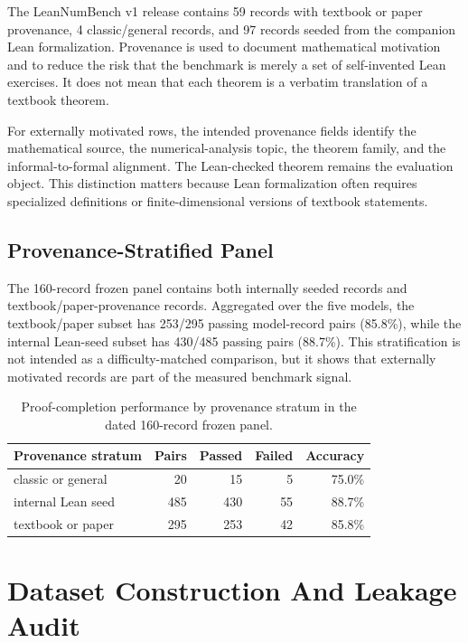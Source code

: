 The LeanNumBench v1 release contains 59 records with textbook or paper
provenance, 4 classic/general records, and 97 records seeded from the companion
Lean formalization. Provenance is used to document mathematical motivation and
to reduce the risk that the benchmark is merely a set of self-invented Lean
exercises. It does not mean that each theorem is a verbatim translation of a
textbook theorem.

For externally motivated rows, the intended provenance fields identify the
mathematical source, the numerical-analysis topic, the theorem family, and the
informal-to-formal alignment. The Lean-checked theorem remains the evaluation
object. This distinction matters because Lean formalization often requires
specialized definitions or finite-dimensional versions of textbook statements.

\subsection{Provenance-Stratified Panel}

The 160-record frozen panel contains both internally seeded records and
textbook/paper-provenance records. Aggregated over the five models, the
textbook/paper subset has 253/295 passing model-record pairs (85.8\%), while
the internal Lean-seed subset has 430/485 passing pairs (88.7\%). This
stratification is not intended as a difficulty-matched comparison, but it shows
that externally motivated records are part of the measured benchmark signal.

\begin{table}[H]
\centering
\caption{Proof-completion performance by provenance stratum in the dated
160-record frozen panel.}
\label{tab:supp-provenance-strata}
\small
\begin{tabular}{lrrrr}
\toprule
Provenance stratum & Pairs & Passed & Failed & Accuracy\\
\midrule
classic or general & 20 & 15 & 5 & 75.0\%\\
internal Lean seed & 485 & 430 & 55 & 88.7\%\\
textbook or paper & 295 & 253 & 42 & 85.8\%\\
\bottomrule
\end{tabular}
\end{table}

\section{Dataset Construction And Leakage Audit}

